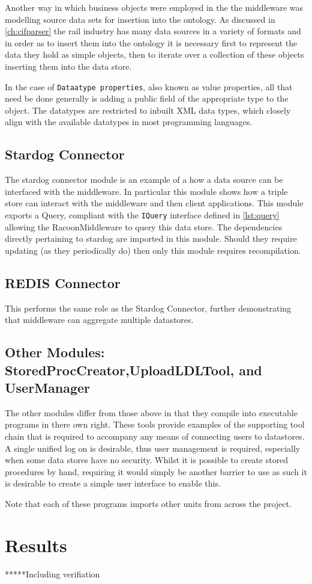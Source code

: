  Another way in which business objects were employed in the the middleware was modelling source data sets for insertion into the ontology. As discussed in \autoref{ch:cifparser} the rail industry has many data sources in a variety of formats and in order as to insert them into the ontology it is necessary first to represent the data they hold as simple objects, then to iterate over a collection of these objects inserting them into the data store.

In the case of \texttt{Dataatype properties}, also known as value properties, all that need be done generally is adding a public field of the appropriate type to the object. The datatypes are restricted to inbuilt XML data types, which closely align with the available datatypes in most programming languages. 

\subsection{Stardog Connector}

The stardog connector module is an example of a how a data source can be interfaced with the middleware. In particular this module shows how a triple store can interact with the middleware and then client applications. This module exports a Query, compliant with the \texttt{IQuery} interface defined in \autoref{lst:query} allowing the RacoonMiddleware to query this data store. The dependencies directly pertaining to stardog are imported in this module. Should they require updating (as they periodically do) then only this module requires recompilation.

\subsection{REDIS Connector}

This performs the same role as the Stardog Connector, further demonstrating that middleware can aggregate multiple datastores.


\subsection{Other Modules: StoredProcCreator,UploadLDLTool, and UserManager}
The other modules differ from those above in that they compile into executable programs in there own right. These tools provide examples of the supporting tool chain that is required to accompany any means of connecting users to datastores. A single unified log on is desirable, thus user management is required, especially when some data stores have no security. Whilst it is possible to create stored procedures by hand, requiring it would simply be another barrier to use as such it is desirable to create a simple user interface to enable this. 

Note that each of these programs imports other units from across the project.
\section{Results}
*****Including verifiation